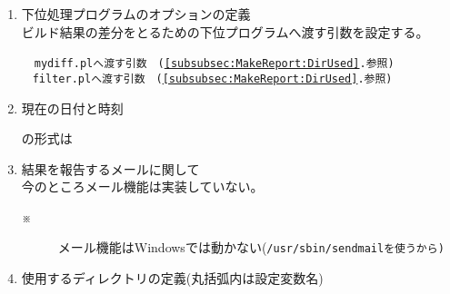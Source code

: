 \medskip
\begin{Proc}[b]
\begin{enumerate}
  \item	下位処理プログラムのオプションの定義\\
        ビルド結果の差分をとるための下位プログラムへ渡す引数を設定する。
	\def\tmpRef{\ref{subsubsec:MakeReport:DirUsed}.参照}
	\begin{narrow}[\WID]
		　\tt{mydiff.pl}へ渡す引数　(\tmpRef)\\
		　\tt{filter.pl}へ渡す引数　(\tmpRef)\\
	\end{narrow}
	
  \item	現在の日付と時刻
	\begin{narrow}[\WID]
		の形式は
	\end{narrow}

  \item	結果を報告するメールに関して\\
	今のところメール機能は実装していない。
	{\small \begin{description}
	  \item[※]
		メール機能はWindowsでは動かない(\tt{/usr/sbin/sendmail}を使うから)
	\end{description}}

  \item	\label{subsubsec:MakeReport:DirUsed}
	使用するディレクトリの定義(丸括弧内は設定変数名)
	\begin{narrow}[30pt]\begin{minipage}{.8\textwidth}
	\end{minipage}\end{narrow}


\end{enumerate}
\end{Proc}
